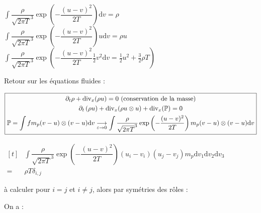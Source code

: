 \documentclass[12pt,a4paper]{article}
\begin{document}
\begin{dem}
			\begin{minipage}[t]{18cm}
				$\displaystyle\int \dfrac\rho{\sqrt{2\pi T}^3} \exp\left(-\dfrac{(u-v)^2}{2T}\right)\mathrm dv = \rho$ \\
			$\displaystyle\int \dfrac\rho{\sqrt{2\pi T}^3} \exp\left(-\dfrac{(u-v)^2}{2T}\right)u\mathrm dv = \rho u$ \hspace{.5cm} $\displaystyle\int \dfrac\rho{\sqrt{2\pi T}^3}\exp\left(-\dfrac{(u-v)^2}{2T}\frac12 v^2 \mathrm dv = \frac12 u^2 + \frac32 \rho T\right)$
			\end{minipage}
\end{dem}

\vspace{-.5cm}

Retour sur les équations fluides :

\[
\fbox{$\begin{gathered}
	\partial_t\rho + \mathrm{div}_x(\rho u) = 0 \text{ (conservation de la masse)}\\
	\partial_t\left(\rho u\right) + \mathrm{div}_x(\rho u\otimes u) + \mathrm{div}_x(\mathbb P) = 0 \\
	\mathbb P = \displaystyle \int fm_p (v-u) \otimes (v-u) \mathrm dv \underset{\varepsilon\to0}\longrightarrow \int \dfrac\rho{\sqrt{2\pi T}^3}\exp\left(-\dfrac{(u-v)^2}{2T}\right)m_p (v-u)\otimes(v-u) \mathrm dv
\end{gathered}$}
\]

$\begin{aligned}[t]
	&\displaystyle\int\dfrac\rho{\sqrt{2\pi T}^3} \exp\left(-\dfrac{(u-v)^2}{2T}\right)(u_i-v_i)(u_j-v_j)m_p \mathrm dv_1\mathrm dv_2 \mathrm dv_3\\
	=&\rho T \delta_{i,j}
\end{aligned}$ \hspace{.5cm}  \begin{minipage}[t]{7cm}
	à calculer pour $i=j$ et $i \not= j$, alors par symétries des rôles :
\end{minipage}

\vspace{.5cm}

On a : 
\end{document}
